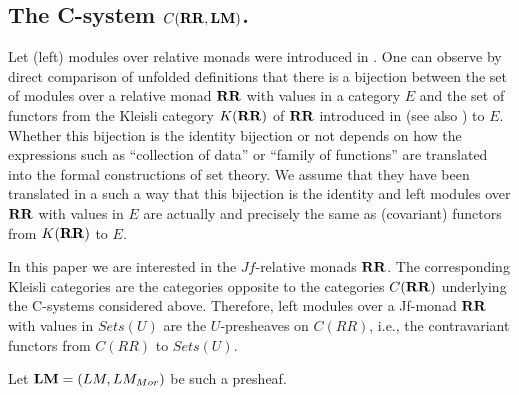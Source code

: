 \documentclass[11pt]{article}
\newcommand{\RR}{{\bf RR}}
\newcommand{\LM}{{\bf LM}}
\begin{document}
\subsection{The C-system $C(\RR,\LM)$.}
%
Let (left) modules over relative monads were introduced in \cite[Definition 9]{Ahrens2016}. One can observe by direct comparison of unfolded definitions that there is a bijection between the set of modules over a relative monad $\RR$ with values in a category $E$ and the set of functors from the Kleisli category $K(\RR)$ of $\RR$ introduced in \cite[p.8]{ACU2} (see also \cite[Constr. 2.9]{LandJf}) to $E$. Whether this bijection is the identity bijection or not depends on how the expressions such as ``collection of data'' or ``family of functions'' are translated into the formal constructions of set theory. We assume that they have been translated in a such a way that this bijection is the identity and left modules over $\RR$ with values in $E$ are actually and precisely the same as (covariant) functors from $K(\RR)$ to $E$. 

In this paper we are interested in the $Jf$-relative monads $\RR$. The corresponding Kleisli categories are the categories opposite to the categories $C(\RR)$ underlying the C-systems considered above. Therefore, left modules over a Jf-monad $\RR$ with values in $Sets(U)$ are the $U$-presheaves on $C(RR)$, i.e., the contravariant functors from $C(RR)$ to $Sets(U)$. 

Let $\LM=(LM,LM_{Mor})$ be such a presheaf.
\end{document}
